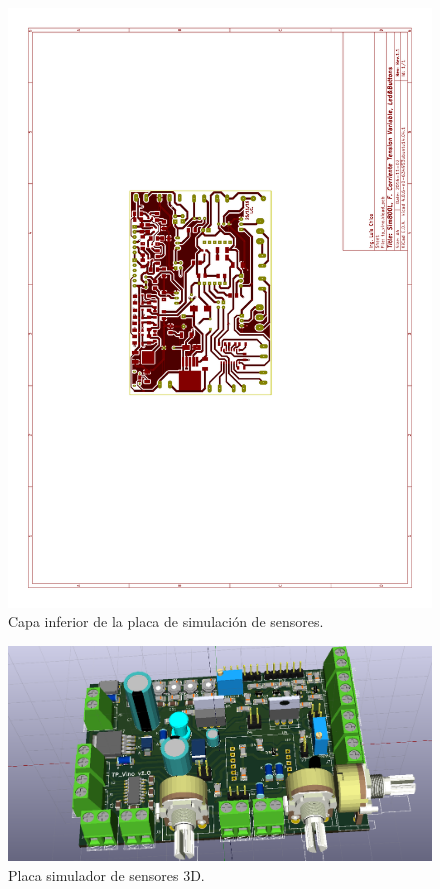 \begin{figure}[!hp]
  \centering
  \includegraphics[page=2,angle=270,clip,trim=5.5cm 10cm 7.7cm 8.5cm]{./Figures/pcb_layer.pdf}
  \caption{Capa inferior de la placa de simulación de sensores.}
  \label{fig:layer_inf}
\end{figure}

\begin{figure}[!hp]
  \centering
  \includegraphics[scale=0.3]{./Figures/pcb_3d.png}
  \caption{Placa simulador de sensores 3D.}
  \label{fig:pcb3d}
\end{figure}

